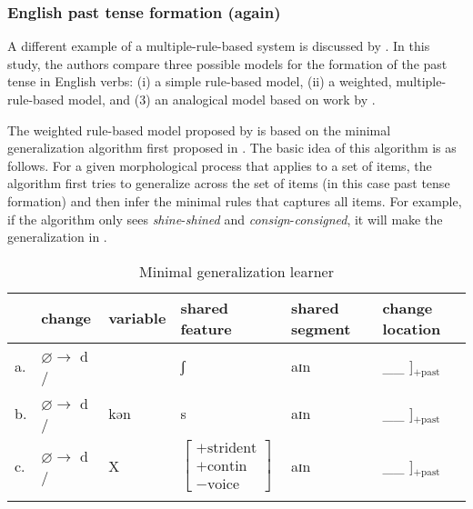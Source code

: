 \subsubsection{English past tense formation (again)}


A different example of a multiple-rule-based system is discussed by \textcite{Albright.2003}. In this study, the authors compare three possible models for the formation of the past tense in English verbs: (i) a simple rule-based model, (ii) a weighted, multiple-rule-based model, and (3) an analogical model based on work by \textcite{Nosofsky.1990}.

The weighted rule-based model proposed by \textcite{Albright.2003} is based on the minimal generalization algorithm first proposed in \textcite{Albright.1999}. The basic idea of this algorithm is as follows. For a given morphological process that applies to a set of items, the algorithm first tries to generalize across the set of items (in this case past tense formation) and then infer the minimal rules that captures all items. For example, if the algorithm only sees \textit{shine}-\textit{shined} and \textit{consign}-\textit{consigned}, it will make the generalization in .

 

\begin{table}
    \small
    \caption{Minimal generalization learner} \label{tab:minima-gen-al}
    \begin{tabular}[t]{llllll}
      \lsptoprule
      & change & variable & shared feature & shared segment & change location \\
      \midrule
      a. & $\varnothing{}\rightarrow$ d / & & ʃ & aɪn & \_\_ ]$_{+\text{past}}$ \\
      b. & $\varnothing{}\rightarrow$ d / & kən & s & aɪn & \_\_ ]$_{+\text{past}}$ \\
      c. & $\varnothing{}\rightarrow$ d / & X & $\left[\begin{array}{c}
                                               +\text{strident}\\
                                               +\text{contin}\\
                                               -\text{voice}
                                             \end{array}\right]$ & aɪn & \_\_ ]$_{+\text{past}}$ \\
      \lspbottomrule
    \end{tabular}
\end{table}

